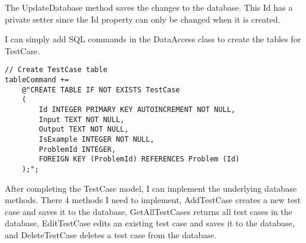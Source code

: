 \documentclass[report.tex]{subfiles}
\begin{document}
The UpdateDatabase method saves the changes to the database. This Id has a private setter since the Id property can only be changed when it is created.

I can simply add SQL commands in the DataAccess class to create the tables for TestCase.

\begin{verbatim}
// Create TestCase table
tableCommand +=
    @"CREATE TABLE IF NOT EXISTS TestCase
    (
        Id INTEGER PRIMARY KEY AUTOINCREMENT NOT NULL,
        Input TEXT NOT NULL,
        Output TEXT NOT NULL,
        IsExample INTEGER NOT NULL,
        ProblemId INTEGER,
        FOREIGN KEY (ProblemId) REFERENCES Problem (Id)
    );";
\end{verbatim}


After completing the TestCase model, I can implement the underlying database methods. There 4 methods I need to implement, AddTestCase creates a new test case and saves it to the database, GetAllTestCases returns all test cases in the database, EditTestCase edits an existing test case and saves it to the database, and DeleteTestCase deletes a test case from the database.
\end{document}
